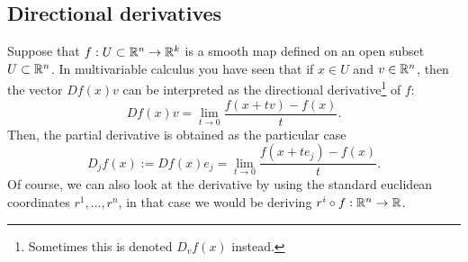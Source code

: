 



\subsection{Directional derivatives}

Suppose that $f: U\subset\mathbb{R}^n\to\mathbb{R}^k$ is a smooth map defined on an open subset $U\subset \mathbb{R}^n$.
In multivariable calculus you have seen that if $x\in U$ and $v\in\mathbb{R}^n$, then the vector $Df(x) v$ can be interpreted as the directional derivative\footnote{Sometimes this is denoted $D_v f(x)$ instead.} of $f$:
\begin{equation}
    Df(x) v = \lim_{t\to0}\frac{f(x+tv) - f(x)}{t}.
\end{equation}
Then, the partial derivative is obtained as the particular case
\begin{equation}
    D_jf(x) := Df(x) e_j = \lim_{t\to0} \frac{f(x+te_j) - f(x)}{t}.
\end{equation}
Of course, we can also look at the derivative by using the standard euclidean coordinates $r^1, \ldots, r^n$, in that case we would be deriving $r^i \circ f : \mathbb{R}^n \to \mathbb{R}$.

